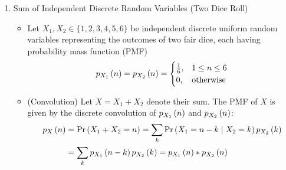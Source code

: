 \begin{enumerate}[label=\thesubsection.\arabic*, ref=\thesubsection.\theenumi,itemsep=0pt]
\item Sum of Independent Discrete Random Variables (Two Dice Roll)
\begin{itemize}
\item Let $X_1, X_2 \in \{1, 2, 3, 4, 5, 6\}$ be independent discrete uniform random variables representing the outcomes of two fair dice, each having probability mass function (PMF)
\begin{align}
p_{X_1}\left(n\right) = p_{X_2}\left(n\right) = \begin{cases} 
\frac{1}{6}, & 1 \le n \le 6 \\ 
0, & \text{otherwise} 
\end{cases} 
\label{eq:EE26BTECH11213-dice_uniform_pmf}
\end{align}

\item (Convolution) Let $X = X_1 + X_2$ denote their sum. The PMF of $X$ is given by the discrete convolution of $p_{X_1}\left(n\right)$ and $p_{X_2}\left(n\right)$:
\begin{align}
p_X\left(n\right) &= \Pr\left(X_1 + X_2 = n\right) = \sum_{k} \Pr\left(X_1 = n - k \mid X_2 = k\right) p_{X_2}\left(k\right) \\
&= \sum_{k} p_{X_1}\left(n - k\right) p_{X_2}\left(k\right) = p_{X_1}\left(n\right) * p_{X_2}\left(n\right) \label{eq:EE26BTECH11213-dice_convolution}
\end{align}


\end{itemize}
\end{enumerate}
